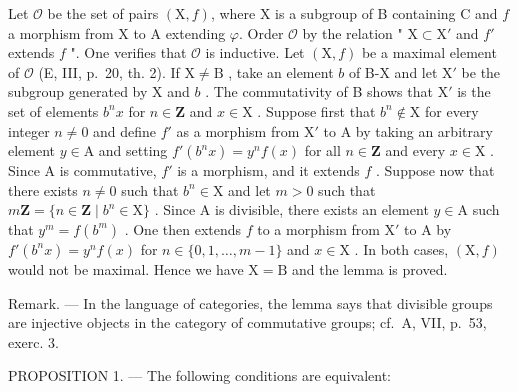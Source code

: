 Let \(\mathcal{O}\) be the set of pairs \((\mathrm{X},f)\), where \(\mathrm{X}\) is a subgroup of B containing C and \(f\) a morphism from \(\mathrm{X}\) to A extending \(\varphi\). Order \(\mathcal{O}\) by the relation " \(\mathrm{X} \subset \mathrm{X}'\) and \(f'\) extends \(f\) ". One verifies that \(\mathcal{O}\) is inductive. Let \((\mathrm{X},f)\) be a maximal element of \(\mathcal{O}\) (E, III, p.~20, th. 2). If \(\mathrm{X} \neq \mathrm{B}\) , take an element \(b\) of B-X and let \(\mathrm{X}'\) be the subgroup generated by \(\mathrm{X}\) and \(b\) . The commutativity of B shows that \(\mathrm{X}'\) is the set of elements \(b^n x\) for \(n \in \mathbf{Z}\) and \(x \in \mathrm{X}\) . Suppose first that \(b^n \notin \mathrm{X}\) for every integer \(n \neq 0\) and define \(f'\) as a morphism from \(\mathrm{X}'\) to A by taking an arbitrary element \(y \in \mathrm{A}\) and setting \(f'(b^n x) = y^n f(x)\) for all \(n \in \mathbf{Z}\) and every \(x \in \mathrm{X}\) . Since A is commutative, \(f'\) is a morphism, and it extends \(f\) . Suppose now that there exists \(n \neq 0\) such that \(b^n \in \mathrm{X}\) and let \(m > 0\) such that \(m\mathbf{Z} = \{n \in \mathbf{Z} \mid b^n \in \mathrm{X}\}\) . Since A is divisible, there exists an element \(y \in \mathrm{A}\) such that \(y^m = f(b^m)\) . One then extends \(f\) to a morphism from \(\mathrm{X}'\) to A by \(f'(b^n x) = y^n f(x)\) for \(n \in \{0,1,\ldots,m-1\}\) and \(x \in \mathrm{X}\) . In both cases, \((\mathrm{X},f)\) would not be maximal. Hence we have \(\mathrm{X} = \mathrm{B}\) and the lemma is proved.

Remark. --- In the language of categories, the lemma says that divisible groups are injective objects in the category of commutative groups; cf.~A, VII, p.~53, exerc. 3.

PROPOSITION 1. --- The following conditions are equivalent:

